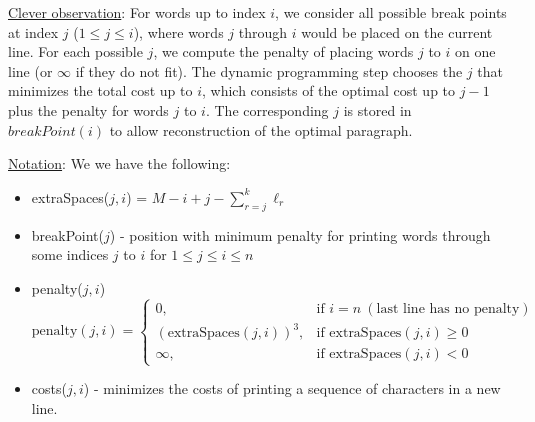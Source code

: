\begin{customsolutionbox}
    \underline{Clever observation}: 
        For words up to index $i$, we consider all possible break points at index $j$ ($1 \leq j \leq i$), where words $j$ through $i$ would be placed on the current line. 
        For each possible $j$, we compute the penalty of placing words $j$ to $i$ on one line (or $\infty$ if they do not fit). 
        The dynamic programming step chooses the $j$ that minimizes the total cost up to $i$, which consists of the optimal cost up to $j-1$ plus the penalty for words $j$ to $i$. 
        The corresponding $j$ is stored in $breakPoint(i)$ to allow reconstruction of the optimal paragraph.


    \underline{Notation}: We we have the following:
    \begin{itemize}
        \item extraSpaces($j, i$) = $M - i+j - \sum_{r=j}^k \ell_r$
        \item breakPoint($j$) - position with minimum penalty for printing words through some indices $j$ to $i$ for $1 \leq j \leq i \leq n$ 
        \item penalty($j, i$)
            \[
                \text{penalty}(j, i) =
                \begin{cases}
                0, & \text{if } i = n \ (\text{last line has no penalty}) \\[8pt]
                \left(\text{extraSpaces}(j, i)\right)^3, & \text{if } \text{extraSpaces}(j, i) \geq 0 \\[8pt]
                \infty, & \text{if } \text{extraSpaces}(j, i) < 0
                \end{cases}
            \]
        \item costs($j, i$) - minimizes the costs of printing a sequence of characters in a new line.
    \end{itemize}


\end{customsolutionbox}
